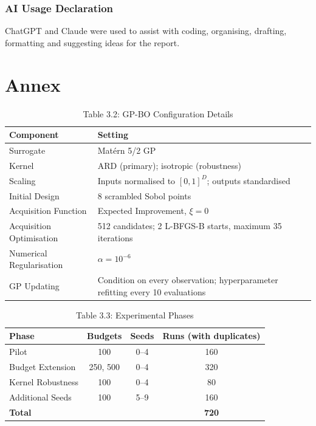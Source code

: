 \documentclass[11pt]{article}
\begin{document}
\subsubsection*{AI Usage Declaration}
ChatGPT and Claude were used to assist with coding, organising, drafting, formatting and suggesting ideas for the report.



\section*{Annex}


\begin{table}[H]
\centering
\caption*{Table 3.2: GP-BO Configuration Details}
\small
\begin{tabularx}{\textwidth}{lX}
\toprule
\textbf{Component} & \textbf{Setting} \\
\midrule
Surrogate & Mat\'ern 5/2 GP \\
Kernel & ARD (primary); isotropic (robustness) \\
Scaling & Inputs normalised to $[0,1]^D$;
outputs standardised \\
Initial Design & 8 scrambled Sobol points \\
Acquisition Function & Expected Improvement, $\xi=0$ \\
Acquisition Optimisation & 512 candidates;
2 L-BFGS-B starts, maximum 35 iterations \\
Numerical Regularisation & $\alpha=10^{-6}$ \\
GP Updating & Condition on every observation;
hyperparameter refitting every 10 evaluations \\
\bottomrule
\end{tabularx}
\end{table}

\begin{table}[H]
\centering
\caption*{Table 3.3: Experimental Phases }
\small
\begin{tabular}{lccc}
\toprule
\textbf{Phase} & \textbf{Budgets} & \textbf{Seeds} & \textbf{Runs (with duplicates)} \\
\midrule
Pilot & 100 & 0--4 & 160 \\
Budget Extension & 250, 500 & 0--4 & 320 \\
Kernel Robustness & 100 & 0--4 & 80 \\
Additional Seeds & 100 & 5--9 & 160 \\
\midrule
\textbf{Total} & & & \textbf{720} \\
\bottomrule
\end{tabular}
\end{table}
\end{document}
